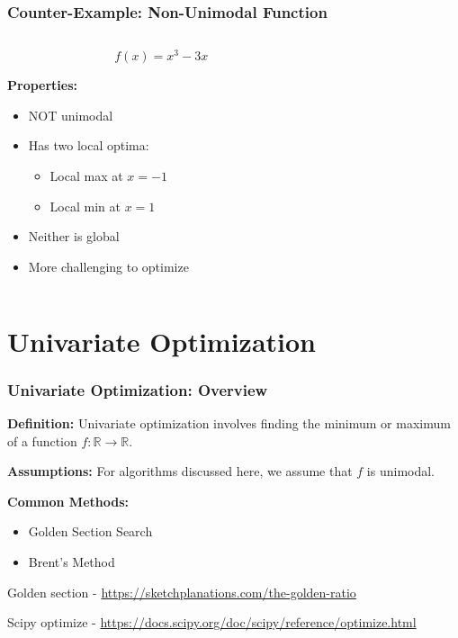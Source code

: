 \documentclass{beamer}
\begin{document}
\begin{frame}
\frametitle{Counter-Example: Non-Unimodal Function}
\begin{columns}
\begin{column}{0.5\textwidth}
$$f(x) = x^3 - 3x$$

\vspace{0.3cm}

\textbf{Properties:}
\begin{itemize}
    \item NOT unimodal
    \item Has two local optima:
    \begin{itemize}
        \item Local max at $x = -1$
        \item Local min at $x = 1$
    \end{itemize}
    \item Neither is global
    \item More challenging to optimize
\end{itemize}
\end{column}
\begin{column}{0.5\textwidth}
\end{column}
\end{columns}
\end{frame}



\section{Univariate Optimization}

\begin{frame}
\frametitle{Univariate Optimization: Overview}

\textbf{Definition:} Univariate optimization involves finding the minimum or maximum of a function $f: \mathbb{R} \to \mathbb{R}$.

\textbf{Assumptions:} For algorithms discussed here, we assume that $f$ is unimodal.

\textbf{Common Methods:}
\begin{itemize}
    \item Golden Section Search
    \item Brent's Method
\end{itemize}

Golden section - \url{https://sketchplanations.com/the-golden-ratio}

Scipy optimize - \url{https://docs.scipy.org/doc/scipy/reference/optimize.html}

\end{frame}
\end{document}
